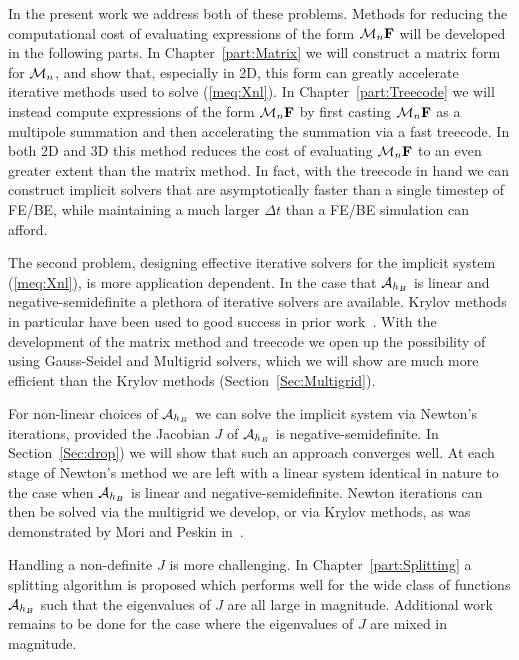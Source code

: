 In the present work we address both of these problems. Methods for reducing the computational cost of evaluating expressions of the form $\mathcal{M}_n\mathbf{F}$ will be developed in the following parts. In Chapter~\ref{part:Matrix} we will construct a matrix form for $\mathcal{M}_n$, and show that, especially in 2D, this form can greatly accelerate iterative methods used to solve (\ref{meq:Xnl}). In Chapter~\ref{part:Treecode} we will instead compute expressions of the form $\mathcal{M}_n\mathbf{F}$ by first casting $\mathcal{M}_n\mathbf{F}$ as a multipole summation and then accelerating the summation via a fast treecode. In both 2D and 3D this method reduces the cost of evaluating $\mathcal{M}_n\mathbf{F}$ to an even greater extent than the matrix method. In fact, with the treecode in hand we can construct implicit solvers that are asymptotically faster than a single timestep of FE/BE, while maintaining a much larger $\Delta t$ than a FE/BE simulation can afford.

The second problem, designing effective iterative solvers for the implicit system (\ref{meq:Xnl}),  is more application dependent. In the case that $\mathcal{A}_{h_B}$ is linear and negative-semidefinite a plethora of iterative solvers are available. Krylov methods in particular have been used to good success in prior work~\cite{MP2008}. With the development of the matrix method and treecode we open up the possibility of using Gauss-Seidel and Multigrid solvers, which we will show are much more efficient than the Krylov methods (Section~\ref{Sec:Multigrid}).

For non-linear choices of $\mathcal{A}_{h_B}$ we can solve the implicit system via Newton's iterations, provided the Jacobian $J$ of $\mathcal{A}_{h_B}$ is negative-semidefinite. In Section~\ref{Sec:drop}) we will show that such an approach converges well. At each stage of Newton's method we are left with a linear system identical in nature to the case when $\mathcal{A}_{h_B}$ is linear and negative-semidefinite. Newton iterations can then be solved via the multigrid we develop, or via Krylov methods, as was demonstrated by Mori and Peskin in~\cite{MP2008}.

Handling a non-definite $J$ is more challenging. In Chapter~\ref{part:Splitting} a splitting algorithm is proposed which performs well for the wide class of functions $\mathcal{A}_{h_B}$ such that the eigenvalues of $J$ are all large in magnitude. Additional work remains to be done for the case where the eigenvalues of $J$ are mixed in magnitude.

